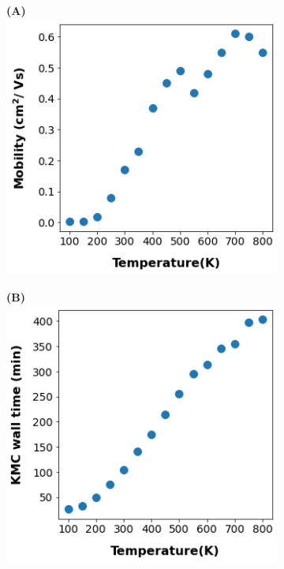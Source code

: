 \begin{figure}
\centering
\begin{subfigure}{.5\textwidth}
    \textbf{(A)}
    \centering
    \includegraphics[width=.9\textwidth]{figures/temp.png}
    \newline
\end{subfigure}%
\begin{subfigure}{.5\textwidth}
    \textbf{(B)}
    \centering
    \includegraphics[width=.9\textwidth]{figures/temp_simtime_plot.png}

\end{subfigure}
\end{figure}
